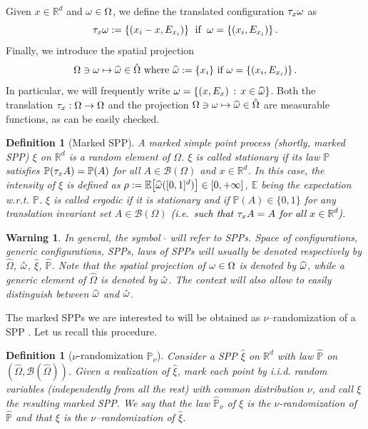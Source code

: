 \documentclass[12pt,a4paper,reqno]{amsart}
\newtheorem{Definition}[Theorem]{Definition}
\newtheorem{Warning}[Theorem]{Warning}
\newcommand{\cB}{\ensuremath{\mathcal B}}
\newcommand{\bbE}{{\ensuremath{\mathbb E}} }
\newcommand{\bbP}{{\ensuremath{\mathbb P}} }
\newcommand{\bbR}{{\ensuremath{\mathbb R}} }
\let\O=\Omega \let\P=\Pi   \let\Ps=\Psi \let\Si=\Sigma \let\X=\Xi
\newcommand{\rosso}{\textcolor{black}} %
\newcommand{\be}{\begin{equation}}
\newcommand{\en}{\end{equation}}
\begin{document}
    Given $x\in\bbR^d$ and  $ \o\in \O$, we define the translated configuration $\tau_x\omega$  as
\be\label{traslare_bis}
\t_x\o:= \{ (x_i-x, E_{x_i}) \}\; \text{ if }\; \o=\{ (x_i,E_{x_i})\}\,.
\en
 Finally, 
 we introduce the spatial projection
\be
\O \ni \o \mapsto \widehat{\o} \in \hat \O \text{ where } \widehat{\o}:=\{x_i\} \text{ if }
\o = \{(x_i, E_{x_i})\}\,.
\en
 In particular, we will frequently  write $\omega=\{ (x, E_x)\,:\, x\in \widehat {\omega}\}$. Both the translation  $\t_x:\O\to \O$ and the projection $\O\ni \o \mapsto \widehat{\o} \in \hat \O$ are measurable functions, as can be easily checked.
 

\begin{Definition}[Marked SPP] \label{def_mspp}
A \emph{marked simple point process} (shortly, marked SPP) $\xi$  on $\bbR^d$ is a random element of  $\O$.  $\xi$ is called \emph{stationary} if its law $\bbP$ satisfies $\bbP( \t_x A)= \bbP(A)$ for all $A\in \cB(\O)$ and $x\in\bbR^d$. In this case, the intensity of $\xi$ is defined as $\rho:=\bbE\bigl[ \widehat\o([0,1]^d) \bigr]\in [0,+\infty]$, $\bbE$ being the expectation w.r.t. $\bbP$.
$\xi$  is called \emph{ergodic} if it is stationary  and if $\bbP(A)\in \{0,1\}$ for any translation invariant set $A\in \cB(\O)$ \rosso{(i.e.~such that $\tau_x A=A$ for all $x\in \bbR^d$).} 
 \end{Definition}

\begin{Warning} In general, the symbol $\; \hat{}$ will refer to SPPs. Space of configurations, generic configurations, SPPs, laws of SPPs will 
usually be denoted respectively by $\hat\O$, $\hat {\omega}$, $\hat \xi$, $\hat \bbP$.
Note that the spatial projection of $\o\in \O$ is denoted by $\widehat{\omega}$, while a generic element of $\hat \O$ is denoted by $\hat{\omega}$. The context will also allow  to easily distinguish between   $\widehat{\omega}$ and $\hat {\omega}$.
\end{Warning}


The marked SPPs we are interested to will be obtained  as
  $\nu$--randomization of a SPP \cite{Kal}. Let us recall  this procedure.



\begin{Definition}[$\nu$-randomization $\hat \bbP_\nu$] \label{def_randomization}
Consider   a SPP $\hat \xi$ on $\bbR^d$ with law  $\hat\bbP$ on $(\hat\O, \cB(\hat\O))$. Given a realization of $\hat \xi$, mark each point by i.i.d. random variables  (independently from all the rest) with common distribution $\nu$, and call $\xi$ the resulting marked SPP. 
We say that the law $\hat \bbP_\nu$ of 
  $\xi$ is the  $\nu$-randomization of $\hat \bbP$ and that   $\xi$ is the $\nu$--randomization of $\hat \xi$.  
 \end{Definition}
 
\end{document}
